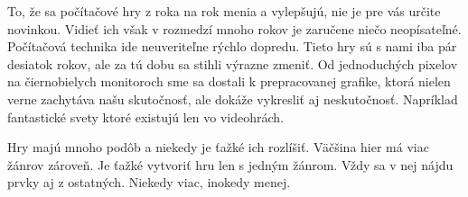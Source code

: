 \documentclass[10pt,oneside,slovak,a4paper]{article}
\begin{document}
To, že sa počítačové hry z roka na rok menia a vylepšujú, nie je pre vás určite novinkou. Vidieť ich však v rozmedzí mnoho rokov je zaručene niečo neopísateľné. Počítačová technika ide neuveriteľne rýchlo dopredu. Tieto hry sú s nami iba pár desiatok rokov, ale za tú dobu sa stihli výrazne zmeniť. Od jednoduchých pixelov na čiernobielych monitoroch sme sa dostali k prepracovanej grafike, ktorá nielen verne zachytáva našu skutočnosť, ale dokáže vykresliť aj neskutočnosť. Napríklad fantastické svety ktoré existujú len vo videohrách.


Hry majú mnoho podôb a niekedy je ťažké ich rozlíšiť. Väčšina hier má viac žánrov zároveň. Je ťažké vytvoriť hru len s jedným žánrom. Vždy sa v nej nájdu prvky aj z ostatných. Niekedy viac, inokedy menej.



%






\end{document}
